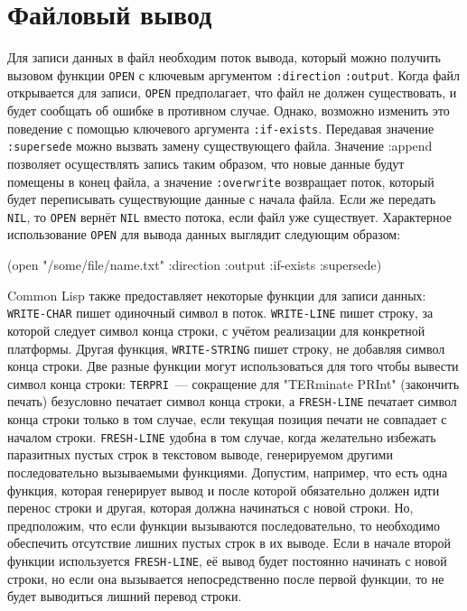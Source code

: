 \section{Файловый вывод}

Для записи данных в файл необходим поток вывода, который можно получить вызовом функции
\lstinline{OPEN} с ключевым аргументом \lstinline{:direction} \lstinline{:output}. Когда файл открывается
для записи, \lstinline{OPEN} предполагает, что файл не должен существовать, и будет сообщать об
ошибке в противном случае. Однако, возможно изменить это поведение с помощью ключевого
аргумента \lstinline{:if-exists}. Передавая значение \lstinline{:supersede} можно вызвать замену
существующего файла. Значение :append позволяет осуществлять запись таким образом, что
новые данные будут помещены в конец файла, а значение \lstinline{:overwrite} возвращает поток,
который будет переписывать существующие данные с начала файла. Если же передать
\lstinline{NIL}, то \lstinline{OPEN} вернёт \lstinline{NIL} вместо потока, если файл уже
существует. Характерное использование \lstinline{OPEN} для вывода данных выглядит следующим
образом:

\begin{myverb}
(open "/some/file/name.txt" :direction :output :if-exists :supersede)
\end{myverb}

Common Lisp также предоставляет некоторые функции для записи данных: \lstinline{WRITE-CHAR}
пишет одиночный символ в поток. \lstinline{WRITE-LINE} пишет строку, за которой следует символ
конца строки, с учётом реализации для конкретной платформы. Другая функция,
\lstinline{WRITE-STRING} пишет строку, не добавляя символ конца строки. Две разные функции
могут использоваться для того чтобы вывести символ конца строки: \lstinline{TERPRI}~---
сокращение для "TERminate PRInt" (закончить печать) безусловно печатает символ конца
строки, а \lstinline{FRESH-LINE} печатает символ конца строки только в том случае, если текущая
позиция печати не совпадает с началом строки. \lstinline{FRESH-LINE} удобна в том случае, когда
желательно избежать паразитных пустых строк в текстовом выводе, генерируемом другими
последовательно вызываемыми функциями. Допустим, например, что есть одна функция, которая
генерирует вывод и после которой обязательно должен идти перенос строки и другая, которая
должна начинаться с новой строки. Но, предположим, что если функции вызываются
последовательно, то необходимо обеспечить отсутствие лишних пустых строк в их выводе. Если
в начале второй функции используется \lstinline{FRESH-LINE}, её вывод будет постоянно начинать
с новой строки, но если она вызывается непосредственно после первой функции, то не будет
выводиться лишний перевод строки.

